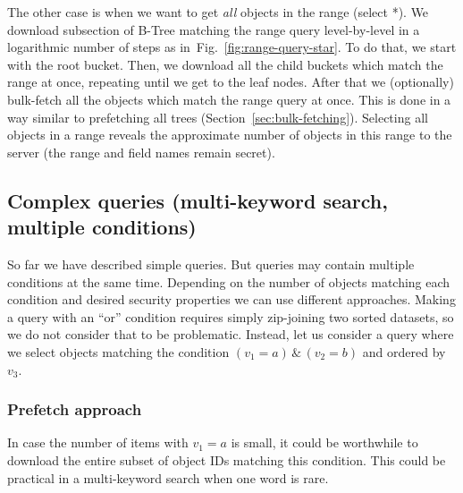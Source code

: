 \documentclass[notitlepage]{revtex4-1}
\newcommand{\figref}[1]{Fig.~\ref{#1}}
\begin{document}
The other case is when we want to get \emph{all} objects in the range (select *).
We download subsection of B-Tree matching the range query level-by-level in a logarithmic number of steps as in~\figref{fig:range-query-star}.
To do that, we start with the root bucket.
Then, we download all the child buckets which match the range at once, repeating until we get to the leaf nodes.
After that we (optionally) bulk-fetch all the objects which match the range query at once.
This is done in a way similar to prefetching all trees (Section~\ref{sec:bulk-fetching}).
Selecting all objects in a range reveals the approximate number of objects in this range to the server (the range and field names remain secret).

\subsection{Complex queries (multi-keyword search, multiple conditions)}

So far we have described simple queries.
But queries may contain multiple conditions at the same time.
Depending on the number of objects matching each condition and desired security properties we can use different approaches.
Making a query with an ``or'' condition requires simply zip-joining two sorted datasets, so we do not consider that to be problematic.
Instead, let us consider a query where we select objects matching the condition $(v_1 = a) \,\&\, (v_2 = b)$ and ordered by $v_3$.

\subsubsection{Prefetch approach}
\label{sec:prefetch}
%

In case the number of items with $v_1=a$ is small, it could be worthwhile to download the entire subset of object IDs matching this condition.
This could be practical in a multi-keyword search when one word is rare.
\end{document}
